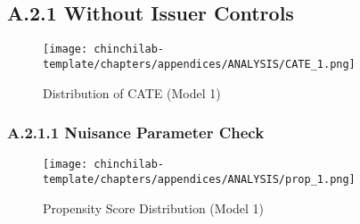 \subsection{A.2.1 Without Issuer Controls}

\begin{figure}[H]
    \centering
    \texttt{[image: chinchilab-template/chapters/appendices/ANALYSIS/CATE\_1.png]}
    \caption{Distribution of CATE (Model 1)}
    \label{fig:my_label}
\end{figure}

\subsubsection{A.2.1.1 Nuisance Parameter Check}
\begin{figure}[h!]
    \centering
    \texttt{[image: chinchilab-template/chapters/appendices/ANALYSIS/prop\_1.png]}
    \caption{Propensity Score Distribution (Model 1)}
    \label{fig:my_label}
\end{figure}

